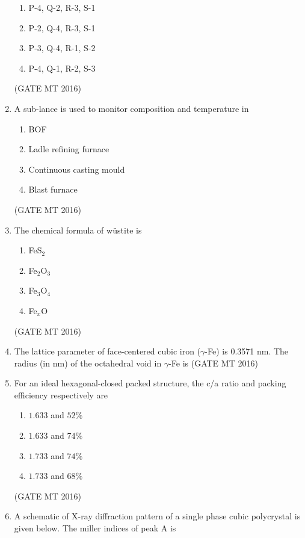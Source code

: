 \documentclass[11pt, letterpaper]{article}
\theoremstyle{remark}
\begin{document}
\begin{enumerate}
\begin{enumerate}
\item P-4, Q-2, R-3, S-1
\item P-2, Q-4, R-3, S-1
\item P-3, Q-4, R-1, S-2
\item P-4, Q-1, R-2, S-3
\end{enumerate}
\hfill(GATE MT 2016)

\item A sub-lance is used to monitor composition and temperature in
\begin{enumerate}
\item BOF
\item Ladle refining furnace
\item Continuous casting mould
\item Blast furnace
\end{enumerate}
\hfill(GATE MT 2016)

\item The chemical formula of wüstite is
\begin{enumerate}
\item FeS$_2$
\item Fe$_2$O$_3$
\item Fe$_3$O$_4$
\item Fe$_x$O
\end{enumerate}
\hfill(GATE MT 2016)

\item The lattice parameter of face-centered cubic iron ($\gamma$-Fe) is 0.3571 nm. The radius (in nm) of the octahedral void in $\gamma$-Fe is
\hfill(GATE MT 2016)

\item For an ideal hexagonal-closed packed structure, the c/a ratio and packing efficiency
respectively are
\begin{multicols}{2}
\begin{enumerate}
\item $1.633$ and $52\%$
\item $1.633$ and $74\%$
\item $1.733$ and $74\%$
\item $1.733$ and $68\%$
\end{enumerate}
\end{multicols}
\hfill(GATE MT 2016)

\item A schematic of X-ray diffraction pattern of a single phase cubic polycrystal is given below. The miller indices of peak A is


\end{enumerate}
\end{document}
